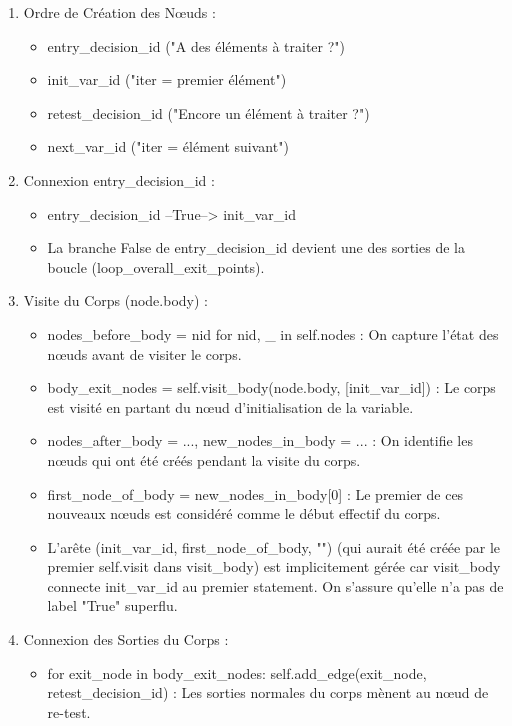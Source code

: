\documentclass[11pt,a4paper]{article}
\begin{document}
\begin{enumerate}
    
    \item Ordre de Création des Nœuds :
    \begin{itemize}
        \item entry\_decision\_id ("A des éléments à traiter ?")
        \item init\_var\_id ("iter = premier élément")
        \item retest\_decision\_id ("Encore un élément à traiter ?")
        \item next\_var\_id ("iter = élément suivant")
    \end{itemize}

    \item Connexion entry\_decision\_id :
    \begin{itemize}
        \item entry\_decision\_id --True--> init\_var\_id
        \item La branche False de entry\_decision\_id devient une des sorties de la boucle (loop\_overall\_exit\_points).
    \end{itemize}    

    \item Visite du Corps (node.body) :
    \begin{itemize}
        \item nodes\_before\_body = {nid for nid, \_ in self.nodes} : On capture l'état des nœuds avant de visiter le corps.
        \item body\_exit\_nodes = self.visit\_body(node.body, [init\_var\_id]) : Le corps est visité en partant du nœud d'initialisation de la variable.
        \item nodes\_after\_body = ..., new\_nodes\_in\_body = ... : On identifie les nœuds qui ont été créés pendant la visite du corps.
        \item first\_node\_of\_body = new\_nodes\_in\_body[0] : Le premier de ces nouveaux nœuds est considéré comme le début effectif du corps.
        \item L'arête (init\_var\_id, first\_node\_of\_body, "") (qui aurait été créée par le premier self.visit dans visit\_body) est implicitement gérée car visit\_body connecte init\_var\_id au premier statement. On s'assure qu'elle n'a pas de label "True" superflu.
    \end{itemize}

    \item Connexion des Sorties du Corps :
    \begin{itemize}
        \item for exit\_node in body\_exit\_nodes: self.add\_edge(exit\_node, retest\_decision\_id) : Les sorties normales du corps mènent au nœud de re-test.
    \end{itemize}


\end{enumerate}
\end{document}
